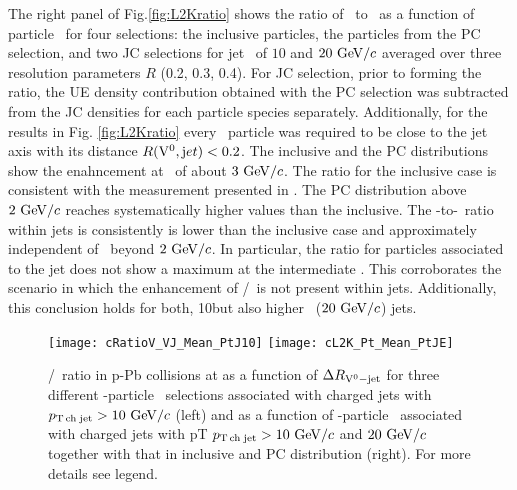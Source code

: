 
The right panel of Fig.\ref{fig:L2Kratio} shows the ratio of \lda\ to \ks\ as a function of particle \pt\ for four selections: the inclusive particles, the particles from the PC selection, and two JC selections for jet \pt\ of $10$ and $20~\mathrm{GeV}/c$ averaged over three resolution parameters $R$ (0.2, 0.3, 0.4). 
For JC selection, prior to forming the ratio, the UE density contribution obtained with the PC selection was subtracted from the JC densities for each particle species separately.
Additionally, for the results in Fig. \ref{fig:L2Kratio} every \Vzero\ particle was required to be close to the jet axis with its distance $R({\rm V}^0,{\mathrm jet}) < 0.2$.
The inclusive and the PC distributions show the enahncement at \pt\ of about $3~\mathrm{GeV}/c$. 
The ratio for the inclusive case is consistent with the measurement presented in \cite{Abelev:2013haa}.
The PC distribution above $2~\mathrm{GeV}/c$ reaches systematically higher values than the inclusive. 
The \lda-to-\ks\ ratio within jets is consistently is lower than the inclusive case and approximately independent of \pt\ beyond $2~\mathrm{GeV}/c$.
In particular, the ratio for particles associated to the jet does not show a maximum at the intermediate \pt.
This corroborates the scenario in which the enhancement of \lda/\ks\ is not present within jets.
Additionally, this conclusion holds for both, 10\gevc but also higher \pt\ ($20~\mathrm{GeV}/c$) jets.

\begin{figure}[htbp]
	\centering
	\texttt{[image: cRatioV\_VJ\_Mean\_PtJ10]}
	\texttt{[image: cL2K\_Pt\_Mean\_PtJE]}
	\caption{\lda/\ks\ ratio in p-Pb collisions at  as a function of $\Delta R_{{\rm V}^{0}-{\rm jet}}$ for three different \Vzero-particle \pt\ selections associated with charged jets with $p_\mathrm{T\,ch\;jet}>10~\mathrm{GeV}/c$ (left) and as a function of \Vzero-particle \pt\ associated with charged jets with pT $p_\mathrm{T\,ch\;jet}>10~\mathrm{GeV}/c$ and $20~\mathrm{GeV}/c$ together with that in inclusive and PC distribution (right). For more details see legend.}
	\label{fig:L2Kratio}
	\label{fig:LKR}
\end{figure}


